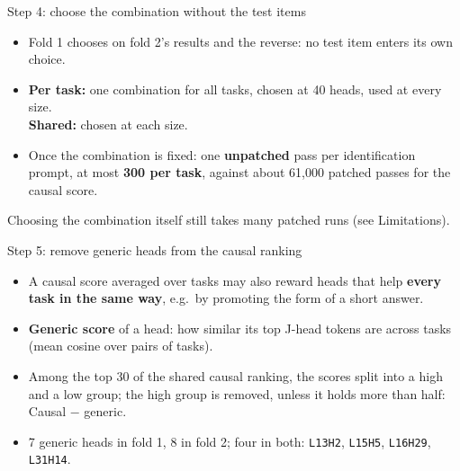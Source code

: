 \documentclass[aspectratio=169,11pt,xcolor=table]{beamer}
\newcommand{\gnote}[1]{{\footnotesize\color{gray}#1}}
\newcommand{\spaced}{\setlength{\itemsep}{0.55em}}
\newcommand{\CausalG}{\textcolor{cCausG}{Causal $-$ generic}}
\begin{document}
\begin{frame}{Step 4: choose the combination without the test items}
\centering
{}

\vspace{1em}
\raggedright
\begin{itemize}\spaced
\item Fold 1 chooses on fold 2's results and the reverse: no test item enters its own choice.
\item \textbf{Per task:} one combination for all tasks, chosen at 40 heads, used at every size.\\
      \textbf{Shared:} chosen at each size.
\item Once the combination is fixed: one \textbf{unpatched} pass per identification prompt,
      at most \textbf{300 per task}, against about 61{,}000 patched passes for the causal score.
\end{itemize}
\vfill
\gnote{Choosing the combination itself still takes many patched runs (see Limitations).}
\end{frame}

\begin{frame}{Step 5: remove generic heads from the causal ranking}
\begin{itemize}\spaced
\item A causal score averaged over tasks may also reward heads that help \textbf{every task in the same way},
      e.g.\ by promoting the form of a short answer.
\item \textbf{Generic score} of a head: how similar its top J-head tokens are across tasks
      (mean cosine over pairs of tasks).
\item Among the top 30 of the shared causal ranking, the scores split into a high and a low group;
      the high group is removed, unless it holds more than half: \CausalG.
\item 7 generic heads in fold 1, 8 in fold 2; four in both:
      \texttt{L13H2}, \texttt{L15H5}, \texttt{L16H29}, \texttt{L31H14}.
\end{itemize}
\end{frame}
\end{document}
